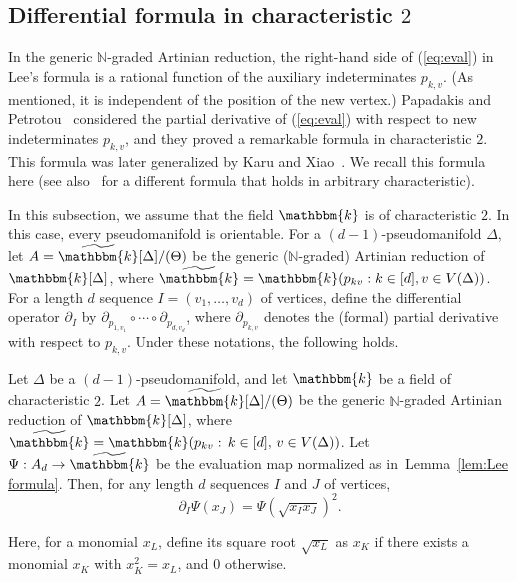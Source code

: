 \subsection{Differential formula in characteristic \texorpdfstring{$2$}{2}}
In the generic $\mathbb{N}$-graded Artinian reduction, the right-hand side of (\ref{eq:eval}) in Lee's formula is a rational function of the auxiliary indeterminates $p_{k,v}$. (As mentioned, it is independent of the position of the new vertex.)
Papadakis and Petrotou~\cite{PP} considered the partial derivative of (\ref{eq:eval}) with respect to new indeterminates $p_{k,v}$, and they proved a remarkable formula in characteristic $2$.
This formula was later generalized by Karu and Xiao~\cite[Theorem 4.1]{KX}.
We recall this formula here (see also~\cite{APP} for a different formula that holds in arbitrary characteristic).

In this subsection, we assume that the field $\mathbbm{k}$ is of characteristic $2$. In this case, every pseudomanifold is orientable.
For a $(d-1)$-pseudomanifold $\Delta$, let $A=\widetilde{\mathbbm{k}}[\Delta]/(\Theta)$ be the generic ($\mathbb{N}$-graded) Artinian reduction of $\mathbbm{k}[\Delta]$, where $\widetilde{\mathbbm{k}}=\mathbbm{k}(p_{kv}:k \in [d], v \in V(\Delta))$.
For a length $d$ sequence $I=(v_1,\ldots,v_d)$ of vertices, define the differential operator $\partial_I$ by $\partial_{p_{1,v_1}}\circ \cdots \circ \partial_{p_{d,v_d}}$, where $\partial_{p_{k,v}}$ denotes the (formal) partial derivative with respect to $p_{k,v}$. Under these notations, the following holds.
\begin{theorem}{\cite[Theorem 4.1]{KX}} \label{thm:KX}
Let $\Delta$ be a $(d-1)$-pseudomanifold, and let $\mathbbm{k}$ be a field of characteristic $2$.
Let $A=\widetilde{\mathbbm{k}}[\Delta]/(\Theta)$ be the generic $\mathbb{N}$-graded Artinian reduction of $\mathbbm{k}[\Delta]$, where $\widetilde{\mathbbm{k}}=\mathbbm{k}(p_{kv}:\, k\in [d], \, v\in V(\Delta))$.
Let $\Psi:A_{d} \rightarrow \widetilde{\mathbbm{k}}$ be the evaluation map normalized as in~Lemma~\ref{lem:Lee formula}.
Then, for any length $d$ sequences $I$ and $J$ of vertices,
\[
\partial_I \Psi(x_J) =\Psi(\sqrt{x_Ix_J})^2.
\]
\end{theorem}
Here, for a monomial $x_L$, define its square root $\sqrt{x_L}$ as $x_K$ if there exists a monomial $x_K$ with $x_K^2=x_L$, and $0$ otherwise.

